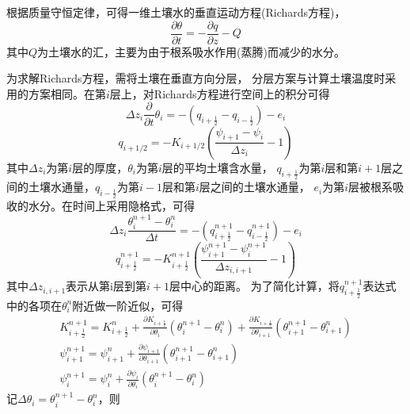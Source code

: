 根据质量守恒定律，可得一维土壤水的垂直运动方程(Richards方程)，
\begin{equation}
\frac{\partial \theta}{\partial t}=-\frac{\partial q}{\partial z}-Q
\end{equation}
其中$Q$为土壤水的汇，主要为由于根系吸水作用(蒸腾)而减少的水分。


为求解Richards方程，需将土壤在垂直方向分层，
分层方案与计算土壤温度时采用的方案相同。在第$i$层上，对Richards方程进行空间上的积分可得
\begin{equation}
\Delta z_{i} \frac{\partial}{\partial t} \theta_{i}=-\left(q_{i+\frac{1}{2}}-q_{i-\frac{1}{2}}\right)-e_{i}
\end{equation}
\begin{equation}
q_{i+1 / 2}=-K_{i+1 / 2}\left(\frac{\psi_{i+1}-\psi_{i}}{\Delta z_{i}}-1\right)
\end{equation}
其中$\Delta {z_i}$为第$i$层的厚度，$\theta_i$为第$i$层的平均土壤含水量，
$q_{i+\frac{1}{2}}$为第$i$层和第$i+1$层之间的土壤水通量，$q_{i-\frac{1}{2}}$为第$i-1$层和第$i$层之间的土壤水通量，
$e_i$为第$i$层被根系吸收的水分。在时间上采用隐格式，可得
\begin{equation}
\Delta z_{i} \frac{\theta_{i}^{n+1}-\theta_{i}^{n}}{\Delta t}=-\left(q_{i+\frac{1}{2}}^{n+1}-q_{i-\frac{1}{2}}^{n+1}\right)-e_{i}
\end{equation}
\begin{equation}
q_{i+\frac{1}{2}}^{n+1}=-K_{i+\frac{1}{2}}^{n+1}\left(\frac{\psi_{i+1}^{n+1}-\psi_{i}^{n+1}}{\Delta z_{i, i+1}}-1\right)
\end{equation}
其中$\Delta z_{i,i+1}$表示从第i层到第$i+1$层中心的距离。
为了简化计算，将$q_{i+\frac{1}{2}}^{n+1}$表达式中的各项在$\theta_i^n$附近做一阶近似，可得
\begin{equation}
\begin{array}{c}K_{i+\frac{1}{2}}^{n+1}=K_{i+\frac{1}{2}}^{n}+\frac{\partial K_{i+\frac{1}{2}}}
    {\partial \theta_{i}}\left(\theta_{i}^{n+1}-\theta_{i}^{n}\right)+\frac{\partial K_{i+\frac{1}{2}}}
    {\partial \theta_{i+1}}\left(\theta_{i+1}^{n+1}-\theta_{i+1}^{n}\right) \\ 
    \psi_{i+1}^{n+1}=\psi_{i+1}^{n}+\frac{\partial \psi_{i+1}}{\partial \theta_{i+1}}\left(\theta_{i+1}^{n+1}-\theta_{i+1}^{n}\right)
     \\ \psi_{i}^{n+1}=\psi_{i}^{n}+\frac{\partial \psi_{i}}{\partial \theta_{i}}\left(\theta_{i}^{n+1}-\theta_{i}^{n}\right)\end{array}
\end{equation}
记$\Delta \theta_i=\theta_i^{n+1}-\theta_i^n$，则
